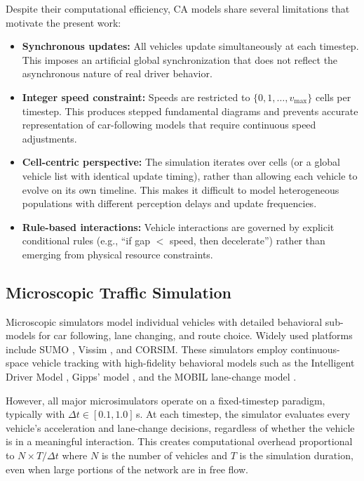 \documentclass[review,authoryear]{elsarticle}
\begin{document}
Despite their computational efficiency, CA models share several limitations that motivate the present work:

\begin{itemize}
    \item \textbf{Synchronous updates:} All vehicles update simultaneously at each timestep. This imposes an artificial global synchronization that does not reflect the asynchronous nature of real driver behavior.

    \item \textbf{Integer speed constraint:} Speeds are restricted to $\{0, 1, \ldots, v_{\max}\}$ cells per timestep. This produces stepped fundamental diagrams and prevents accurate representation of car-following models that require continuous speed adjustments.

    \item \textbf{Cell-centric perspective:} The simulation iterates over cells (or a global vehicle list with identical update timing), rather than allowing each vehicle to evolve on its own timeline. This makes it difficult to model heterogeneous populations with different perception delays and update frequencies.

    \item \textbf{Rule-based interactions:} Vehicle interactions are governed by explicit conditional rules (e.g., ``if gap $<$ speed, then decelerate'') rather than emerging from physical resource constraints.
\end{itemize}

\subsection{Microscopic Traffic Simulation}
\label{sec:lit_microsim}

Microscopic simulators model individual vehicles with detailed behavioral sub-models for car following, lane changing, and route choice. Widely used platforms include SUMO \citep{lopez2018microscopic}, Vissim \citep{fellendorf2010microscopic}, and CORSIM. These simulators employ continuous-space vehicle tracking with high-fidelity behavioral models such as the Intelligent Driver Model \citep[IDM;][]{treiber2000congested}, Gipps' model \citep{gipps1981behavioural}, and the MOBIL lane-change model \citep{kesting2007general}.

However, all major microsimulators operate on a fixed-timestep paradigm, typically with $\Delta t \in [0.1, 1.0]$\,s. At each timestep, the simulator evaluates every vehicle's acceleration and lane-change decisions, regardless of whether the vehicle is in a meaningful interaction. This creates computational overhead proportional to $N \times T / \Delta t$ where $N$ is the number of vehicles and $T$ is the simulation duration, even when large portions of the network are in free flow.
\end{document}
